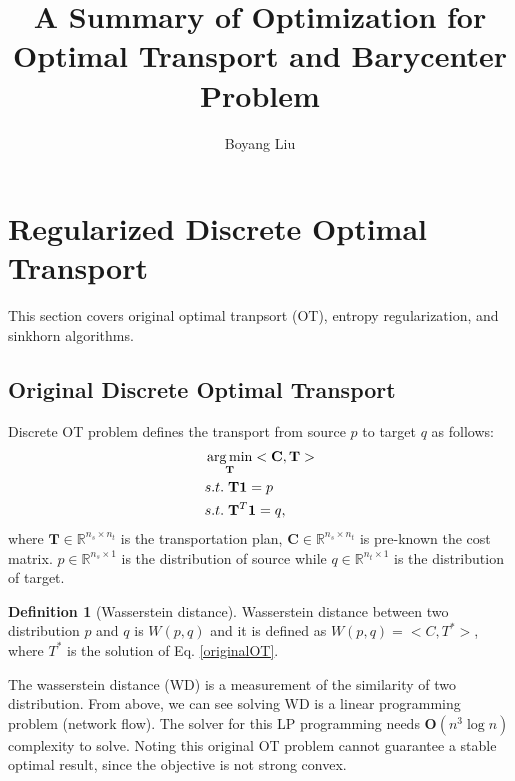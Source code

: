 \documentclass{article}
\DeclareMathOperator*{\argmin}{arg\,min}
\theoremstyle{plain}
\theoremstyle{definition}
\newtheorem{defn}{Definition}[section]
\begin{document}
\title{A Summary of Optimization for Optimal Transport and Barycenter Problem}
\author{Boyang Liu}
\maketitle

\section{Regularized Discrete Optimal Transport}
This section covers original optimal tranpsort (OT), entropy regularization, and sinkhorn algorithms.
\subsection{Original Discrete Optimal Transport}
Discrete OT problem defines the transport from source $p$ to target $q$ as follows:
\begin{align}
	&\argmin_{\mathbf{T}}<\mathbf{C},\mathbf{T}> \nonumber\\
	&s.t.  \hspace{1mm} \mathbf{T}\mathbf{1} = p \nonumber\\
	&s.t.  \hspace{1mm} \mathbf{T}^{T}\mathbf{1} = q, \label{originalOT}
\end{align}
where $\mathbf{T} \in \mathbb{R}^{n_{s} \times n_{t}}$ is the transportation plan, $\mathbf{C} \in \mathbb{R}^{n_{s} \times n_{t}}$ is pre-known the cost matrix. $p \in \mathbb{R}^{n_{s} \times 1}$ is the distribution of source while $q \in \mathbb{R}^{n_{t} \times 1}$ is the distribution of target. 

\begin{defn}[Wasserstein distance]
Wasserstein distance between two distribution $p$ and $q$ is $W(p,q)$ and it is defined as $W(p,q) = <C, T^{*}>$, where $T^{*}$ is the solution of Eq. \ref{originalOT}.
\label{defnWas}
\end{defn}

The wasserstein distance (WD) is a measurement of the similarity of two distribution. From above, we can see solving WD is a linear programming problem (network flow). The solver for this LP programming needs $\mathbf{O}(n^{3}\log n)$ complexity to solve. Noting this original OT problem cannot guarantee a stable optimal result, since the objective is not strong convex.
\end{document}
